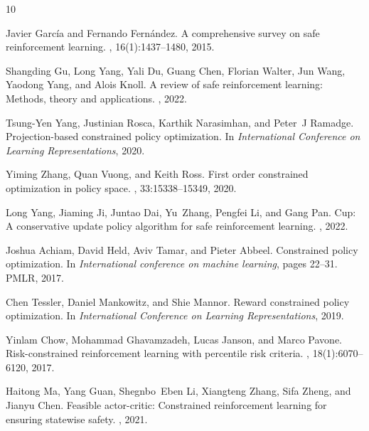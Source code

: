 \documentclass{article}
\theoremstyle{definition}
\begin{document}
\newpage 

%
\begin{thebibliography}{10}

Javier Garc{\'i}a and Fernando Fern{\'a}ndez.
\newblock A comprehensive survey on safe reinforcement learning.
, 16(1):1437--1480, 2015.

Shangding Gu, Long Yang, Yali Du, Guang Chen, Florian Walter, Jun Wang, Yaodong Yang, and Alois Knoll.
\newblock A review of safe reinforcement learning: Methods, theory and applications.
, 2022.

Tsung-Yen Yang, Justinian Rosca, Karthik Narasimhan, and Peter~J Ramadge.
\newblock Projection-based constrained policy optimization.
\newblock In {\em International Conference on Learning Representations}, 2020.

Yiming Zhang, Quan Vuong, and Keith Ross.
\newblock First order constrained optimization in policy space.
, 33:15338--15349, 2020.

Long Yang, Jiaming Ji, Juntao Dai, Yu~Zhang, Pengfei Li, and Gang Pan.
\newblock Cup: A conservative update policy algorithm for safe reinforcement learning.
, 2022.

Joshua Achiam, David Held, Aviv Tamar, and Pieter Abbeel.
\newblock Constrained policy optimization.
\newblock In {\em International conference on machine learning}, pages 22--31. PMLR, 2017.

Chen Tessler, Daniel Mankowitz, and Shie Mannor.
\newblock Reward constrained policy optimization.
\newblock In {\em International Conference on Learning Representations}, 2019.

Yinlam Chow, Mohammad Ghavamzadeh, Lucas Janson, and Marco Pavone.
\newblock Risk-constrained reinforcement learning with percentile risk criteria.
, 18(1):6070--6120, 2017.

Haitong Ma, Yang Guan, Shegnbo~Eben Li, Xiangteng Zhang, Sifa Zheng, and Jianyu Chen.
\newblock Feasible actor-critic: Constrained reinforcement learning for ensuring statewise safety.
, 2021.


\end{thebibliography}
\end{document}

